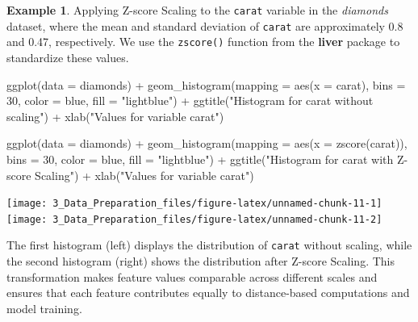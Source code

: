 \documentclass[
  11pt,
]{book}
\makeatletter
\newenvironment{Shaded}{}{}
\newcommand{\AttributeTok}[1]{#1}
\newcommand{\DecValTok}[1]{#1}
\newcommand{\FunctionTok}[1]{#1}
\newcommand{\NormalTok}[1]{#1}
\newcommand{\SpecialCharTok}[1]{\textcolor[rgb]{0.39,0.39,0.39}{#1}}
\newcommand{\StringTok}[1]{\textcolor[rgb]{0.39,0.39,0.39}{#1}}
\newenvironment{kframe}{%
\medskip{}
\setlength{\fboxsep}{.8em}
 \def\at@end@of@kframe{}%
 \ifinner\ifhmode%
  \def\at@end@of@kframe{\end{minipage}}%
  \begin{minipage}{\columnwidth}%
 \fi\fi%
 \def\FrameCommand##1{\hskip\@totalleftmargin \hskip-\fboxsep
 \colorbox{shadecolor}{##1}\hskip-\fboxsep
     \hskip-\linewidth \hskip-\@totalleftmargin \hskip\columnwidth}%
 \MakeFramed {\advance\hsize-\width
   \@totalleftmargin\z@ \linewidth\hsize
   \@setminipage}}%
 {\par\unskip\endMakeFramed%
 \at@end@of@kframe}
\renewenvironment{Shaded}{\begin{kframe}}{\end{kframe}}
\theoremstyle{definition}
\theoremstyle{definition}
\newtheorem{example}{Example}[chapter]
\theoremstyle{definition}
\theoremstyle{definition}
\theoremstyle{remark}
\makeatother
\begin{document}
\begin{example}
\protect\hypertarget{exm:ex-zscore}{}\label{exm:ex-zscore}Applying Z-score Scaling to the \texttt{carat} variable in the \emph{diamonds} dataset, where the mean and standard deviation of \texttt{carat} are approximately 0.8 and 0.47, respectively. We use the \texttt{zscore()} function from the \textbf{liver} package to standardize these values.

\begin{Shaded}
\begin{Highlighting}[]
\FunctionTok{ggplot}\NormalTok{(}\AttributeTok{data =}\NormalTok{ diamonds) }\SpecialCharTok{+}
  \FunctionTok{geom\_histogram}\NormalTok{(}\AttributeTok{mapping =} \FunctionTok{aes}\NormalTok{(}\AttributeTok{x =}\NormalTok{ carat), }\AttributeTok{bins =} \DecValTok{30}\NormalTok{,}
                 \AttributeTok{color =} \StringTok{\textquotesingle{}blue\textquotesingle{}}\NormalTok{, }\AttributeTok{fill =} \StringTok{"lightblue"}\NormalTok{) }\SpecialCharTok{+}
  \FunctionTok{ggtitle}\NormalTok{(}\StringTok{"Histogram for \textasciigrave{}carat\textasciigrave{} without scaling"}\NormalTok{) }\SpecialCharTok{+} 
  \FunctionTok{xlab}\NormalTok{(}\StringTok{"Values for variable \textasciigrave{}carat\textasciigrave{}"}\NormalTok{)}

\FunctionTok{ggplot}\NormalTok{(}\AttributeTok{data =}\NormalTok{ diamonds) }\SpecialCharTok{+}
  \FunctionTok{geom\_histogram}\NormalTok{(}\AttributeTok{mapping =} \FunctionTok{aes}\NormalTok{(}\AttributeTok{x =} \FunctionTok{zscore}\NormalTok{(carat)), }\AttributeTok{bins =} \DecValTok{30}\NormalTok{,}
                 \AttributeTok{color =} \StringTok{\textquotesingle{}blue\textquotesingle{}}\NormalTok{, }\AttributeTok{fill =} \StringTok{"lightblue"}\NormalTok{) }\SpecialCharTok{+}
  \FunctionTok{ggtitle}\NormalTok{(}\StringTok{"Histogram for \textasciigrave{}carat\textasciigrave{} with Z{-}score Scaling"}\NormalTok{) }\SpecialCharTok{+} 
  \FunctionTok{xlab}\NormalTok{(}\StringTok{"Values for variable \textasciigrave{}carat\textasciigrave{}"}\NormalTok{)}
\end{Highlighting}
\end{Shaded}

\texttt{[image: 3\_Data\_Preparation\_files/figure-latex/unnamed-chunk-11-1]} \texttt{[image: 3\_Data\_Preparation\_files/figure-latex/unnamed-chunk-11-2]}

The first histogram (left) displays the distribution of \texttt{carat} without scaling, while the second histogram (right) shows the distribution after Z-score Scaling. This transformation makes feature values comparable across different scales and ensures that each feature contributes equally to distance-based computations and model training.
\end{example}
\end{document}
